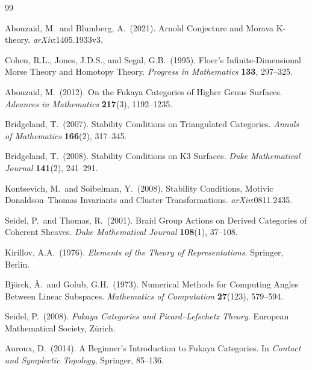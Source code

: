 \documentclass[11pt]{amsart}
\begin{document}
\begin{thebibliography}{99}

Abouzaid, M.\ and Blumberg, A.\ (2021).
Arnold Conjecture and Morava K-theory.
\textit{arXiv}:1405.1933v3.

Cohen, R.L., Jones, J.D.S., and Segal, G.B.\ (1995).
Floer's Infinite-Dimensional Morse Theory and Homotopy Theory.
\textit{Progress in Mathematics} \textbf{133}, 297--325.

Abouzaid, M.\ (2012).
On the Fukaya Categories of Higher Genus Surfaces.
\textit{Advances in Mathematics} \textbf{217}(3), 1192--1235.

Bridgeland, T.\ (2007).
Stability Conditions on Triangulated Categories.
\textit{Annals of Mathematics} \textbf{166}(2), 317--345.

Bridgeland, T.\ (2008).
Stability Conditions on K3 Surfaces.
\textit{Duke Mathematical Journal} \textbf{141}(2), 241--291.

Kontsevich, M.\ and Soibelman, Y.\ (2008).
Stability Conditions, Motivic Donaldson--Thomas Invariants
and Cluster Transformations.
\textit{arXiv}:0811.2435.

Seidel, P.\ and Thomas, R.\ (2001).
Braid Group Actions on Derived Categories of Coherent Sheaves.
\textit{Duke Mathematical Journal} \textbf{108}(1), 37--108.

Kirillov, A.A.\ (1976).
\textit{Elements of the Theory of Representations}.
Springer, Berlin.

Björck, Å.\ and Golub, G.H.\ (1973).
Numerical Methods for Computing Angles Between Linear Subspaces.
\textit{Mathematics of Computation} \textbf{27}(123), 579--594.

Seidel, P.\ (2008).
\textit{Fukaya Categories and Picard--Lefschetz Theory}.
European Mathematical Society, Zürich.

Auroux, D.\ (2014).
A Beginner's Introduction to Fukaya Categories.
In \textit{Contact and Symplectic Topology}, Springer, 85--136.


\end{thebibliography}
\end{document}
